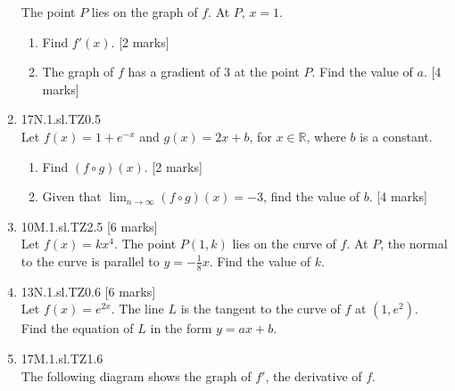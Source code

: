 \documentclass[12pt, twoside]{article}
\begin{document}
\begin{enumerate}
  The point $P$ lies on the graph of $f$. At $P$, $x=1$.
  \begin{enumerate}
    \item Find $f'(x)$. [2 marks]
    \item The graph of $f$ has a gradient of 3 at the point $P$. Find the value of $a$. [4 marks]
  \end{enumerate}

  \item 17N.1.sl.TZ0.5\\
  Let $f(x)=1+e^{-x}$ and $g(x)=2x+b$, for $x \in \mathbb{R}$, where $b$ is a constant.
  \begin{enumerate}
    \item Find $(f \circ g)(x)$. [2 marks]
    \item Given that $\displaystyle \lim_{n \rightarrow \infty} (f \circ g)(x) = -3$, find the value of $b$. [4 marks]
  \end{enumerate}

  \item 10M.1.sl.TZ2.5 [6 marks]\\
  Let $f(x)=kx^4$. The point $P(1,k)$ lies on the curve of $f$. At $P$, the normal to the curve is parallel to $y=- \frac{1}{8} x$. Find the value of $k$.

  \item 13N.1.sl.TZ0.6 [6 marks]\\
  Let $f(x)=e^{2x}$. The line $L$ is the tangent to the curve of $f$ at $(1,e^2)$.\\
  Find the equation of $L$ in the form $y=ax+b$.

  \item 17M.1.sl.TZ1.6\\
  The following diagram shows the graph of $f'$, the derivative of $f$.
  \begin{center}
  \end{center}


\end{enumerate}
\end{document}
